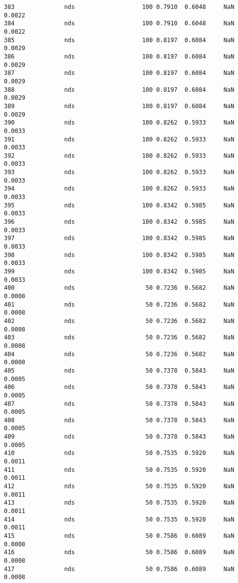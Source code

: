 \documentclass[11pt]{article}
\begin{document}
\begin{Verbatim}[commandchars=\\\{\}]
383              nds                   100 0.7910  0.6048     NaN 0.0022   
384              nds                   100 0.7910  0.6048     NaN 0.0022   
385              nds                   100 0.8197  0.6084     NaN 0.0029   
386              nds                   100 0.8197  0.6084     NaN 0.0029   
387              nds                   100 0.8197  0.6084     NaN 0.0029   
388              nds                   100 0.8197  0.6084     NaN 0.0029   
389              nds                   100 0.8197  0.6084     NaN 0.0029   
390              nds                   100 0.8262  0.5933     NaN 0.0033   
391              nds                   100 0.8262  0.5933     NaN 0.0033   
392              nds                   100 0.8262  0.5933     NaN 0.0033   
393              nds                   100 0.8262  0.5933     NaN 0.0033   
394              nds                   100 0.8262  0.5933     NaN 0.0033   
395              nds                   100 0.8342  0.5985     NaN 0.0033   
396              nds                   100 0.8342  0.5985     NaN 0.0033   
397              nds                   100 0.8342  0.5985     NaN 0.0033   
398              nds                   100 0.8342  0.5985     NaN 0.0033   
399              nds                   100 0.8342  0.5985     NaN 0.0033   
400              nds                    50 0.7236  0.5682     NaN 0.0008   
401              nds                    50 0.7236  0.5682     NaN 0.0008   
402              nds                    50 0.7236  0.5682     NaN 0.0008   
403              nds                    50 0.7236  0.5682     NaN 0.0008   
404              nds                    50 0.7236  0.5682     NaN 0.0008   
405              nds                    50 0.7378  0.5843     NaN 0.0005   
406              nds                    50 0.7378  0.5843     NaN 0.0005   
407              nds                    50 0.7378  0.5843     NaN 0.0005   
408              nds                    50 0.7378  0.5843     NaN 0.0005   
409              nds                    50 0.7378  0.5843     NaN 0.0005   
410              nds                    50 0.7535  0.5920     NaN 0.0011   
411              nds                    50 0.7535  0.5920     NaN 0.0011   
412              nds                    50 0.7535  0.5920     NaN 0.0011   
413              nds                    50 0.7535  0.5920     NaN 0.0011   
414              nds                    50 0.7535  0.5920     NaN 0.0011   
415              nds                    50 0.7586  0.6089     NaN 0.0008   
416              nds                    50 0.7586  0.6089     NaN 0.0008   
417              nds                    50 0.7586  0.6089     NaN 0.0008   

\end{Verbatim}
\end{document}
